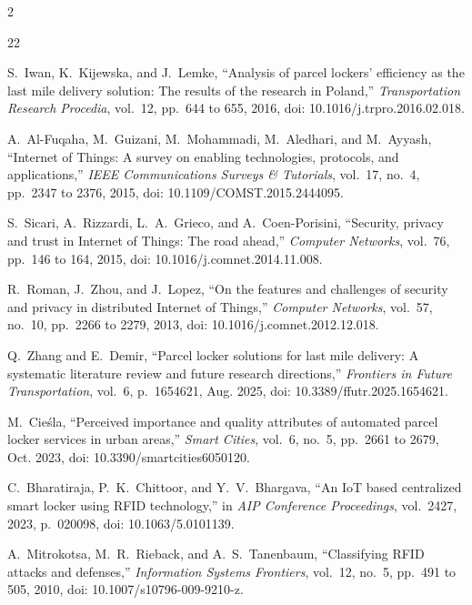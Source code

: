 \documentclass[journal,onecolumn]{IEEEtran}
\begin{document}
\begingroup
\def\IEEEbibitemsep{0pt}
\def\footnotesize{\fontsize{6.4pt}{7.3pt}\selectfont}
\setlength{\multicolsep}{2pt plus 1pt minus 1pt}
\vspace{-3pt}
\begin{multicols}{2}
\begin{thebibliography}{22}

S.~Iwan, K.~Kijewska, and J.~Lemke, ``Analysis of parcel lockers' efficiency as the last mile delivery solution: The results of the research in Poland,'' \emph{Transportation Research Procedia}, vol.~12, pp.~644 to 655, 2016, doi: 10.1016/j.trpro.2016.02.018.

A.~Al-Fuqaha, M.~Guizani, M.~Mohammadi, M.~Aledhari, and M.~Ayyash, ``Internet of Things: A survey on enabling technologies, protocols, and applications,'' \emph{IEEE Communications Surveys \& Tutorials}, vol.~17, no.~4, pp.~2347 to 2376, 2015, doi: 10.1109/COMST.2015.2444095.

S.~Sicari, A.~Rizzardi, L.~A.~Grieco, and A.~Coen-Porisini, ``Security, privacy and trust in Internet of Things: The road ahead,'' \emph{Computer Networks}, vol.~76, pp.~146 to 164, 2015, doi: 10.1016/j.comnet.2014.11.008.

R.~Roman, J.~Zhou, and J.~Lopez, ``On the features and challenges of security and privacy in distributed Internet of Things,'' \emph{Computer Networks}, vol.~57, no.~10, pp.~2266 to 2279, 2013, doi: 10.1016/j.comnet.2012.12.018.

Q.~Zhang and E.~Demir, ``Parcel locker solutions for last mile delivery: A systematic literature review and future research directions,'' \emph{Frontiers in Future Transportation}, vol.~6, p.~1654621, Aug. 2025, doi: 10.3389/ffutr.2025.1654621.

M.~Cie{\'s}la, ``Perceived importance and quality attributes of automated parcel locker services in urban areas,'' \emph{Smart Cities}, vol.~6, no.~5, pp.~2661 to 2679, Oct. 2023, doi: 10.3390/smartcities6050120.

C.~Bharatiraja, P.~K.~Chittoor, and Y.~V.~Bhargava, ``An IoT based centralized smart locker using RFID technology,'' in \emph{AIP Conference Proceedings}, vol.~2427, 2023, p.~020098, doi: 10.1063/5.0101139.

A.~Mitrokotsa, M.~R.~Rieback, and A.~S.~Tanenbaum, ``Classifying RFID attacks and defenses,'' \emph{Information Systems Frontiers}, vol.~12, no.~5, pp.~491 to 505, 2010, doi: 10.1007/s10796-009-9210-z.


\end{thebibliography}
\end{multicols}
\end{document}
